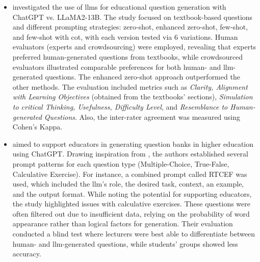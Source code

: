 \begin{itemize}
    \item \cite{al_faraby_analysis_2024} investigated the use of \ac{llms} for educational question generation with ChatGPT vs. LLaMA2-13B. The study focused on textbook-based questions and different prompting strategies: zero-shot, enhanced zero-shot, few-shot, and few-shot with \ac{cot}, with each version tested via 6 variations. Human evaluators (experts and crowdsourcing) were employed, revealing that experts preferred human-generated questions from textbooks, while crowdsourced evaluators illustrated comparable preferences for both human- and \ac{llm}-generated questions. The enhanced zero-shot approach outperformed the other methods. The evaluation included metrics such as \textit{Clarity, Alignment with Learning Objectives} (obtained from the textbooks' sections), \textit{Simulation to critical Thinking, Usefulness, Difficulty Level}, and \textit{Resemblance to Human-generated Questions}. Also, the inter-rater agreement was measured using Cohen's Kappa.
    \vspace{9em}\pagebreak
    \item \cite{vu_chatgpt-based_2024} aimed to support educators in generating question banks in higher education using ChatGPT. Drawing inspiration from \cite{cavojsky_exploring_2023}, the authors established several prompt patterns for each question type (Multiple-Choice, True-False, Calculative Exercise). For instance, a combined prompt called RTCEF was used, which included the \ac{llm}'s role, the desired task, context, an example, and the output format. While noting the potential for supporting educators, the study highlighted issues with calculative exercises. These questions were often filtered out due to insufficient data, relying on the probability of word appearance rather than logical factors for generation. Their evaluation conducted a blind test where lecturers were best able to differentiate between human- and \ac{llm}-generated questions, while students' groups showed less accuracy.

\end{itemize}
